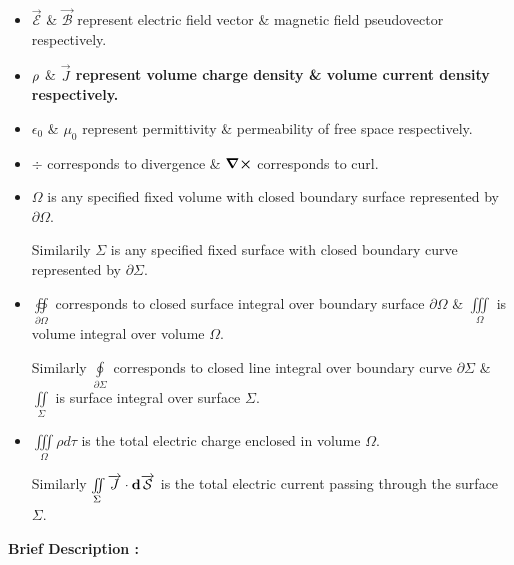 \documentclass[a4paper,12pt]{article}
\begin{document}
\begin{itemize}
	\item $ \overrightarrow{\mathcal E} $ \& $ \overrightarrow{\mathcal B} $ represent electric field vector \& magnetic field pseudovector respectively.
	

	\item $ \bf{\rho} $ \& \bf{ $ \overrightarrow{J} $ } represent volume charge density \& volume current density respectively. 
	

	\item $ \epsilon_{0} $ \& $ \mu_{0} $ represent permittivity \& permeability of free space respectively.
	

	\item $ \div $ corresponds to divergence \& $ \curl $ corresponds to curl.
	

	\item $ \Omega $ is any specified fixed volume with closed boundary surface represented by $ \partial\Omega $.

		Similarily $ \Sigma $ is any specified fixed surface with closed boundary curve represented by $ \partial\Sigma $.
	

	\item $ \oiint \limits_{\partial\Omega} $ corresponds to closed surface integral over boundary surface $ \partial\Omega $ \& $ \iiint \limits_{\Omega} $ is volume integral over volume $ \Omega $.
		
		Similarly $ \oint \limits_{\partial\Sigma} $ corresponds to closed line integral over boundary curve $ \partial\Sigma $ \& $ \iint \limits_{\Sigma} $ is surface integral over surface $ \Sigma $.
	

	\item $ \iiint \limits_{\Omega} \rho d\tau $ is the total electric charge enclosed in volume $ \Omega $.

		Similarly $ \iint \limits_{\Sigma} \bf{\overrightarrow{J}} \cdot d\overrightarrow{\mathcal S} $ is the total electric current passing through the surface $ \Sigma $.
\end{itemize}


\bf{Brief Description :}
\end{document}
